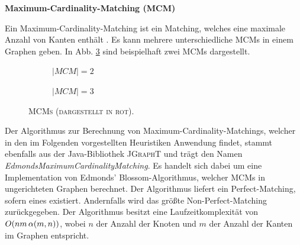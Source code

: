 \textbf{Maximum-Cardinality-Matching (MCM)}

Ein Maximum-Cardinality-Matching ist ein Matching, welches eine maximale Anzahl von Kanten enthält \cite{Gibbons1985}.
Es kann mehrere unterschiedliche \textsc{MCM}s in einem Graphen geben.
In Abb. \ref{fig:mcm_examples} sind beispielhaft zwei \textsc{MCM}s dargestellt.

\begin{figure}[H]
  \begin{subfigure}[b]{0.4\textwidth}
  \centering
  \caption{\textsc{$|MCM| = 2$}}
  \label{fig:mcm1}
  \end{subfigure}
  \hfill
  \begin{subfigure}[b]{0.4\textwidth}
  \centering
    \caption{\textsc{$|MCM| = 3$}}
    \label{fig:mcm_2}
  \end{subfigure}
  \caption{\textsc{MCMs (dargestellt in rot).}}
  \label{fig:mcm_examples}
\end{figure}

Der Algorithmus zur Berechnung von Maximum-Cardinality-Matchings, welcher in den im Folgenden
vorgestellten Heuristiken Anwendung findet, stammt ebenfalls aus der Java-Bibliothek \textsc{JGraphT} \cite{JGraphT} und trägt
den Namen \textit{EdmondsMaximumCardinalityMatching}. Es handelt sich dabei um eine Implementation von Edmonds' Blossom-Algorithmus,
welcher \textsc{MCM}s in ungerichteten Graphen berechnet. Der Algorithmus liefert ein Perfect-Matching, sofern eines existiert.
Andernfalls wird das größte Non-Perfect-Matching zurückgegeben.
Der Algorithmus besitzt eine Laufzeitkomplexität von $O(nm \thinspace \alpha(m, n))$, wobei $n$ der Anzahl der Knoten
und $m$ der Anzahl der Kanten im Graphen entspricht.

